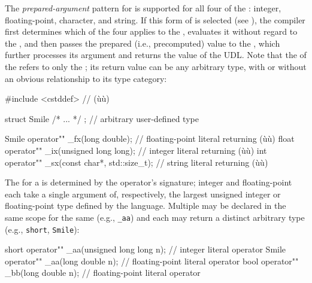 The \emph{prepared-argument} pattern for  is
supported for all four of the : integer,
floating-point, character, and string. If this form of  is selected (see ), the compiler
first determines which of the four  applies
to the , evaluates it without regard to the
, and then passes the prepared (i.e., precomputed)
value to the , which further processes its argument
and returns the value of the UDL. Note that the  of the  refers to only the ; its return value can be any arbitrary type, with or without an
obvious relationship to its type category:

\begin{emcppshiddenlisting}[emcppsbatch=e10]
#include <cstddef>  // (ù{}ù)
\end{emcppshiddenlisting}
\begin{emcppslisting}[emcppsbatch=e10]
struct Smile { /* ... */ };  // arbitrary user-defined type

Smile operator"" _fx(long double);  // floating-point literal returning (ù{}ù)
float operator"" _ix(unsigned long long);  // integer literal returning (ù{}ù)
int operator"" _sx(const char*, std::size_t);  // string literal returning (ù{}ù)
\end{emcppslisting}

\noindent The  for a  is determined by the operator's signature; integer and
floating-point  each take a single argument of,
respectively, the largest unsigned integer or floating-point type
defined by the language. Multiple  may be declared in the same scope for the same  (e.g., \lstinline!_aa!) and each may return a distinct arbitrary
type (e.g., \lstinline!short!, \lstinline!Smile!):

\begin{emcppslisting}[emcppsbatch=e10]
short operator"" _aa(unsigned long long n);  // integer literal operator
Smile operator"" _aa(long double n);         // floating-point literal operator
bool  operator"" _bb(long double n);         // floating-point literal operator
\end{emcppslisting}

